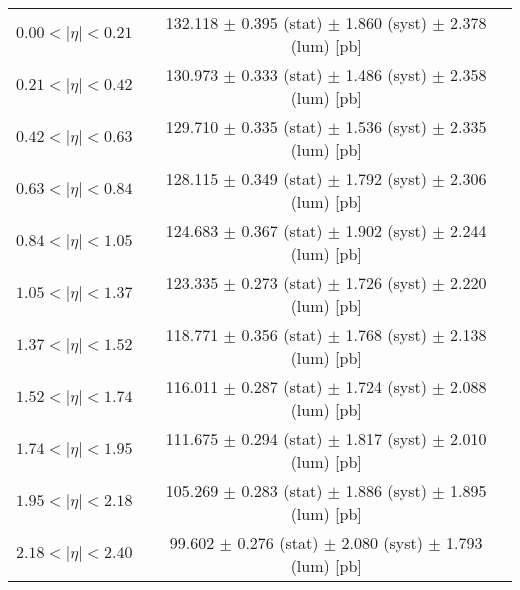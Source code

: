 \begin{tabular}{lc}
\hline
$0.00 < |\eta| <0.21$          & 132.118 $\pm$ 0.395 (stat) $\pm$ 1.860 (syst) $\pm$ 2.378 (lum) [pb]  \\
$0.21 < |\eta| <0.42$          & 130.973 $\pm$ 0.333 (stat) $\pm$ 1.486 (syst) $\pm$ 2.358 (lum) [pb]  \\
$0.42 < |\eta| <0.63$          & 129.710 $\pm$ 0.335 (stat) $\pm$ 1.536 (syst) $\pm$ 2.335 (lum) [pb]  \\
$0.63 < |\eta| <0.84$          & 128.115 $\pm$ 0.349 (stat) $\pm$ 1.792 (syst) $\pm$ 2.306 (lum) [pb]  \\
$0.84 < |\eta| <1.05$          & 124.683 $\pm$ 0.367 (stat) $\pm$ 1.902 (syst) $\pm$ 2.244 (lum) [pb]  \\
$1.05 < |\eta| <1.37$          & 123.335 $\pm$ 0.273 (stat) $\pm$ 1.726 (syst) $\pm$ 2.220 (lum) [pb]  \\
$1.37 < |\eta| <1.52$          & 118.771 $\pm$ 0.356 (stat) $\pm$ 1.768 (syst) $\pm$ 2.138 (lum) [pb]  \\
$1.52 < |\eta| <1.74$          & 116.011 $\pm$ 0.287 (stat) $\pm$ 1.724 (syst) $\pm$ 2.088 (lum) [pb]  \\
$1.74 < |\eta| <1.95$          & 111.675 $\pm$ 0.294 (stat) $\pm$ 1.817 (syst) $\pm$ 2.010 (lum) [pb]  \\
$1.95 < |\eta| <2.18$          & 105.269 $\pm$ 0.283 (stat) $\pm$ 1.886 (syst) $\pm$ 1.895 (lum) [pb]  \\
$2.18 < |\eta| <2.40$          & 99.602 $\pm$ 0.276 (stat) $\pm$ 2.080 (syst) $\pm$ 1.793 (lum) [pb]  \\
\hline
\end{tabular}
